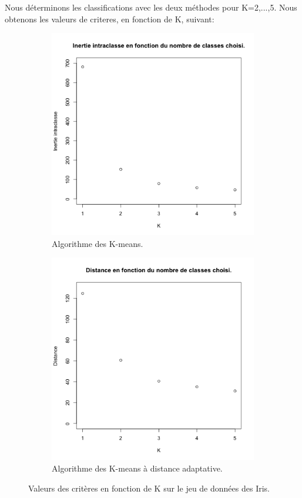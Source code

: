 \documentclass[a4paper,11pt,oneside,roman]{article}
\begin{document}
    Nous déterminons les classifications avec les deux méthodes pour K=2,...,5. 
    Nous obtenons les valeurs de criteres, en fonction de K, suivant:
    \begin{figure}
        \centering
        \begin{subfigure}{.5\textwidth}
          \centering
          \includegraphics[width=.8\linewidth]{imgs/K_means_Iris_critere.png}
          \caption{Algorithme des K-means.}
        \end{subfigure}%
        \begin{subfigure}{.5\textwidth}
          \centering
          \includegraphics[width=.8\linewidth]{imgs/K_means_adapt_Iris_critere.png}
          \caption{Algorithme des K-means à distance adaptative.}
        \end{subfigure}
        \caption{Valeurs des critères en fonction de K sur le jeu de données des Iris.}
        \label{fig_Iris_crit}
    \end{figure}
\end{document}
